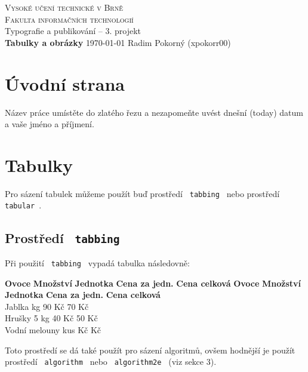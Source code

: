 \documentclass[a4paper,11pt]{article}
\begin{document}
\begin{titlepage}
    \begin{center}
        {\Huge\textsc{Vysoké učení technické v Brně}\\}
        \vspace{0.5em}
        {\huge \textsc{Fakulta informačních technologií}\\}
        \vfill
        \vspace{-5cm}
        {\huge Typografie a publikování – 3. projekt\\}
        \vspace{0.6em}
        {\huge \textbf{Tabulky a obrázky}}
        \vfill
        \Large{\today} \hfill \Large{Radim Pokorný (xpokorr00)}
    \end{center}
\end{titlepage}

\section{Úvodní strana}
    Název práce umístěte do zlatého řezu a nezapomeňte uvést dnešní (today) datum a vaše jméno a příjmení.
\section{Tabulky}
    Pro sázení tabulek můžeme použít buď prostředí \texttt{ tabbing } nebo prostředí \texttt{ tabular }.
\subsection{Prostředí \texttt{ tabbing }}
    Při použití \texttt{ tabbing } vypadá tabulka následovně:
    \begin{tabbing}
        
        \textbf{Ovoce} \hspace{2cm} \= \textbf{Množství} \hspace{1cm} \= \textbf{Jednotka} \hspace{1cm} \= \textbf{Cena za jedn.} \hspace{1cm} \= \textbf{Cena celková} \kill
        \textbf{Ovoce} \> \textbf{Množství} \> \textbf{Jednotka} \> \textbf{Cena za jedn.} \> \textbf{Cena celková} \\
        Jablka  \> kg 90 Kč 70 Kč \\
        Hrušky 5 \> kg 40 Kč 50 Kč \\
        Vodní melouny  \> kus  Kč  Kč \\
    \end{tabbing}
    Toto prostředí se dá také použít pro sázení algoritmů, ovšem hodnější je použít prostředí \texttt{ algorithm } nebo \texttt{ algorithm2e } (viz sekce 3).
\end{document}

